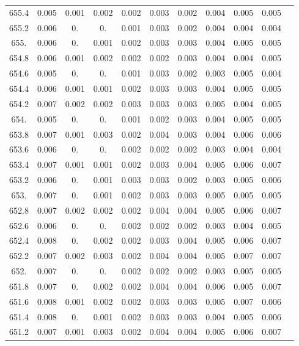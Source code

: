 \documentclass[12pt]{ctexart}
\numberwithin{equation}{section}
\begin{document}
\begin{longtable}{ccccccccccc}
655.4	&	0.005	&	0.001	&	0.002	&	0.002	&	0.003	&	0.002	&	0.004	&	0.005	&	0.005	\\
655.2	&	0.006	&	0.	&	0.	&	0.001	&	0.003	&	0.002	&	0.004	&	0.004	&	0.004	\\
655.	&	0.006	&	0.	&	0.001	&	0.002	&	0.003	&	0.003	&	0.004	&	0.005	&	0.005	\\
654.8	&	0.006	&	0.001	&	0.002	&	0.002	&	0.002	&	0.003	&	0.004	&	0.004	&	0.005	\\
654.6	&	0.005	&	0.	&	0.	&	0.001	&	0.003	&	0.002	&	0.003	&	0.005	&	0.004	\\
654.4	&	0.006	&	0.001	&	0.001	&	0.002	&	0.003	&	0.003	&	0.004	&	0.005	&	0.005	\\
654.2	&	0.007	&	0.002	&	0.002	&	0.003	&	0.003	&	0.003	&	0.005	&	0.004	&	0.005	\\
654.	&	0.005	&	0.	&	0.	&	0.001	&	0.002	&	0.003	&	0.004	&	0.005	&	0.005	\\
653.8	&	0.007	&	0.001	&	0.003	&	0.002	&	0.004	&	0.003	&	0.004	&	0.006	&	0.006	\\
653.6	&	0.006	&	0.	&	0.	&	0.002	&	0.002	&	0.002	&	0.003	&	0.004	&	0.004	\\
653.4	&	0.007	&	0.001	&	0.001	&	0.002	&	0.003	&	0.004	&	0.005	&	0.006	&	0.007	\\
653.2	&	0.006	&	0.	&	0.001	&	0.003	&	0.003	&	0.002	&	0.003	&	0.005	&	0.006	\\
653.	&	0.007	&	0.	&	0.001	&	0.002	&	0.003	&	0.003	&	0.005	&	0.005	&	0.005	\\
652.8	&	0.007	&	0.002	&	0.002	&	0.002	&	0.004	&	0.004	&	0.005	&	0.006	&	0.007	\\
652.6	&	0.006	&	0.	&	0.	&	0.002	&	0.002	&	0.002	&	0.003	&	0.004	&	0.005	\\
652.4	&	0.008	&	0.	&	0.002	&	0.002	&	0.003	&	0.004	&	0.005	&	0.006	&	0.007	\\
652.2	&	0.007	&	0.002	&	0.003	&	0.002	&	0.004	&	0.004	&	0.005	&	0.007	&	0.007	\\
652.	&	0.007	&	0.	&	0.	&	0.002	&	0.002	&	0.002	&	0.003	&	0.005	&	0.005	\\
651.8	&	0.007	&	0.	&	0.002	&	0.002	&	0.004	&	0.004	&	0.006	&	0.005	&	0.007	\\
651.6	&	0.008	&	0.001	&	0.002	&	0.002	&	0.003	&	0.003	&	0.005	&	0.007	&	0.006	\\
651.4	&	0.008	&	0.	&	0.001	&	0.002	&	0.003	&	0.003	&	0.004	&	0.005	&	0.006	\\
651.2	&	0.007	&	0.001	&	0.003	&	0.002	&	0.004	&	0.004	&	0.005	&	0.006	&	0.007	\\

\end{longtable}
\end{document}
